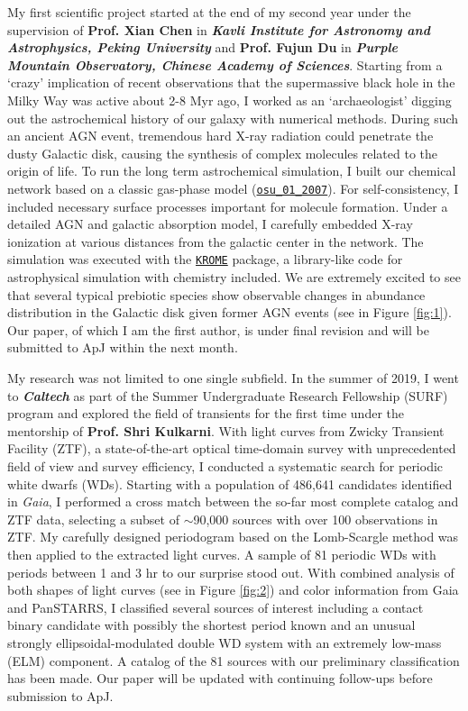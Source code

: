 My first scientific project started at the end of my second year under the supervision of \textbf{Prof. Xian Chen} in \textbf{\textit{Kavli Institute for Astronomy and Astrophysics, Peking University}} and \textbf{Prof. Fujun Du} in \textbf{\textit{Purple Mountain Observatory, Chinese Academy of Sciences}}. Starting from a `crazy' implication of recent observations that the supermassive black hole in the Milky Way was active about 2-8 Myr ago, I worked as an `archaeologist' digging out the astrochemical history of our galaxy with numerical methods. During such an ancient AGN event, tremendous hard X-ray radiation could penetrate the dusty Galactic disk, causing the synthesis of complex molecules related to the origin of life. To run the long term astrochemical simulation, I built our chemical network based on a classic gas-phase model (\href{http://faculty.virginia.edu/ericherb/research_files/osu_01_2007}{\texttt{osu\_01\_2007}}). For self-consistency, I included necessary surface processes important for molecule formation. Under a detailed AGN and galactic absorption model, I carefully embedded X-ray ionization at various distances from the galactic center in the network. The simulation was executed with the \href{http://kromepackage.org}{\texttt{KROME}} package, a library-like code for astrophysical simulation with chemistry included. We are extremely excited to see that several typical prebiotic species show observable changes in abundance distribution in the Galactic disk given former AGN events (see in Figure \ref{fig:1}). Our paper, of which I am the first author, is under final revision and will be submitted to ApJ within the next month.

My research was not limited to one single subfield. In the summer of 2019, I went to \textbf{\textit{Caltech}} as part of the Summer Undergraduate Research Fellowship (SURF) program and explored the field of transients for the first time under the mentorship of \textbf{Prof. Shri Kulkarni}. With light curves from Zwicky Transient Facility (ZTF), a state-of-the-art optical time-domain survey with unprecedented field of view and survey efficiency, I conducted a systematic search for periodic white dwarfs (WDs). Starting with a population of 486,641  candidates identified in \textit{Gaia}, I performed a cross match between the so-far most complete catalog and ZTF data, selecting a subset of $\sim$90,000 sources with over 100 observations in ZTF. My carefully designed periodogram based on the Lomb-Scargle method was then applied to the extracted light curves. A sample of 81 periodic WDs with periods between 1 and 3 hr to our surprise stood out. With combined analysis of both shapes of light curves (see in Figure \ref{fig:2}) and color information from Gaia and PanSTARRS, I classified several sources of interest including a contact binary candidate with possibly the shortest period known and an unusual strongly ellipsoidal-modulated double WD system with an extremely low-mass (ELM) component. A catalog of the 81 sources with our preliminary classification has been made. Our paper will be updated with continuing follow-ups before submission to ApJ.

